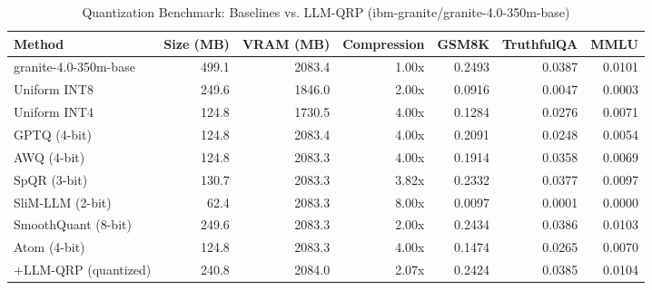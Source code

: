\begin{table}[htbp]
  \centering
  \small
  \caption{Quantization Benchmark: Baselines vs. LLM-QRP (ibm-granite/granite-4.0-350m-base)}
  \label{tab:benchmark}
  \begin{tabular}{lrrrrrr}
    \toprule
    \textbf{Method} & \textbf{Size (MB)} & \textbf{VRAM (MB)} & \textbf{Compression} & \textbf{GSM8K} & \textbf{TruthfulQA} & \textbf{MMLU} \\
    \midrule
    granite-4.0-350m-base & 499.1 & 2083.4 & 1.00x & 0.2493 & 0.0387 & 0.0101 \\
    Uniform INT8 & 249.6 & 1846.0 & 2.00x & 0.0916 & 0.0047 & 0.0003 \\
    Uniform INT4 & 124.8 & 1730.5 & 4.00x & 0.1284 & 0.0276 & 0.0071 \\
    GPTQ (4-bit) & 124.8 & 2083.4 & 4.00x & 0.2091 & 0.0248 & 0.0054 \\
    AWQ (4-bit) & 124.8 & 2083.3 & 4.00x & 0.1914 & 0.0358 & 0.0069 \\
    SpQR (3-bit) & 130.7 & 2083.3 & 3.82x & 0.2332 & 0.0377 & 0.0097 \\
    SliM-LLM (2-bit) & 62.4 & 2083.3 & 8.00x & 0.0097 & 0.0001 & 0.0000 \\
    SmoothQuant (8-bit) & 249.6 & 2083.3 & 2.00x & 0.2434 & 0.0386 & 0.0103 \\
    Atom (4-bit) & 124.8 & 2083.3 & 4.00x & 0.1474 & 0.0265 & 0.0070 \\
    \midrule
    +LLM-QRP (quantized) & 240.8 & 2084.0 & 2.07x & 0.2424 & 0.0385 & 0.0104 \\
    \bottomrule
  \end{tabular}
\end{table}
